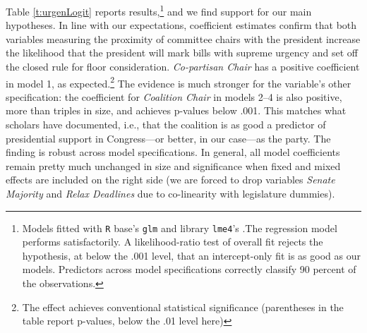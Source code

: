 \documentclass[letter,12pt]{article}
\begin{document}
Table \ref{t:urgenLogit} reports results,\footnote{Models fitted with \texttt{R} base's \texttt{glm} and library \texttt{lme4}'s \citep{lme4.2015}.The regression model performs satisfactorily. A likelihood-ratio test of overall fit rejects the hypothesis, at below the .001 level, that an intercept-only fit is as good as our models. Predictors across model specifications correctly classify 90 percent of the observations.} and we find support for our main hypotheses. In line with our expectations, coefficient estimates confirm that both variables measuring the proximity of committee chairs with the president increase the likelihood that the president will mark bills with supreme urgency and set off the closed rule for floor consideration. \emph{Co-partisan Chair} has a positive coefficient in model 1, as expected.\footnote{The effect achieves conventional statistical significance (parentheses in the table report p-values, below the .01 level here)} The evidence is much stronger for the variable's other specification: the coefficient for \emph{Coalition Chair} in models 2--4 is also positive, more than triples in size, and achieves p-values below .001. This matches what scholars have documented, i.e., that the coalition is as good a predictor of presidential support in Congress---or better, in our case---as the party. The finding is robust across model specifications. In general, all model coefficients remain pretty much unchanged in size and significance when fixed and mixed effects are included on the right side (we are forced to drop variables \emph{Senate Majority} and \emph{Relax Deadlines} due to co-linearity with legislature dummies). 

\end{document}
